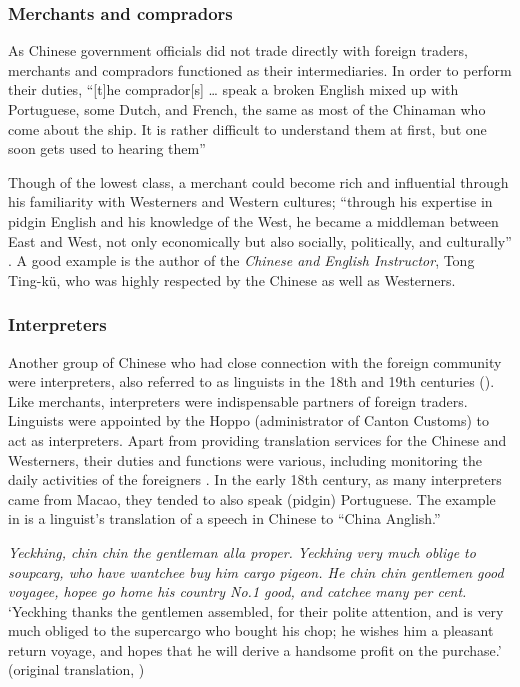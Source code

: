 \documentclass[english,output=paper,colorlinks,citecolor=brown]{../langscibook}
\begin{document}
\subsubsection{Merchants and compradors}\label{sec:7:4.2.1}

As Chinese government officials did not trade directly with foreign traders, merchants and compradors functioned as their intermediaries. In order to perform their duties, “[t]he comprador[s] … speak a broken English mixed up with Portuguese, some Dutch, and French, the same as most of the Chinaman who come about the ship. It is rather difficult to understand them at first, but one soon gets used to hearing them”\citep[29]{Tyng1999}

Though of the lowest class, a merchant could become rich and influential through his familiarity with Westerners and Western cultures; “through his expertise in pidgin English and his knowledge of the West, he became a middleman between East and West, not only economically but also socially, politically, and culturally” \citep[180]{Thao1970}. A good example is the author of the \textit{Chinese and English Instructor}, Tong Ting-kü, who was highly respected by the Chinese as well as Westerners.

\subsubsection{Interpreters}\label{sec:7:4.2.2}

Another group of Chinese who had close connection with the foreign community were interpreters, also referred to as linguists in the 18th and 19th centuries (\citealt[50]{Hunter1882, Van-Dyke2005}). Like merchants, interpreters were indispensable partners of foreign traders. Linguists were appointed by the Hoppo (administrator of Canton Customs) to act as interpreters. Apart from providing translation services for the Chinese and Westerners, their duties and functions were various, including monitoring the daily activities of the foreigners \citep{Chin2016}. In the early 18th century, as many interpreters came from Macao, they tended to also speak (pidgin) Portuguese. The example in  is a linguist’s translation of a speech in Chinese to “China Anglish.” 

\ea \label{ex:7:3}
    \textit{Yeckhing, chin chin the gentleman alla proper. Yeckhing very much oblige to soupcarg, who have wantchee buy him cargo pigeon. He chin chin gentlemen good voyagee, hopee go home his country No.1 good, and catchee many per cent.}\\
    \glt ‘Yeckhing thanks the gentlemen assembled, for their polite attention, and is very much obliged to the supercargo who bought his chop; he wishes him a pleasant return voyage, and hopes that he will derive a handsome profit on the purchase.’ (original translation, \citealt[126]{Tiffany1849})
\z
\end{document}
